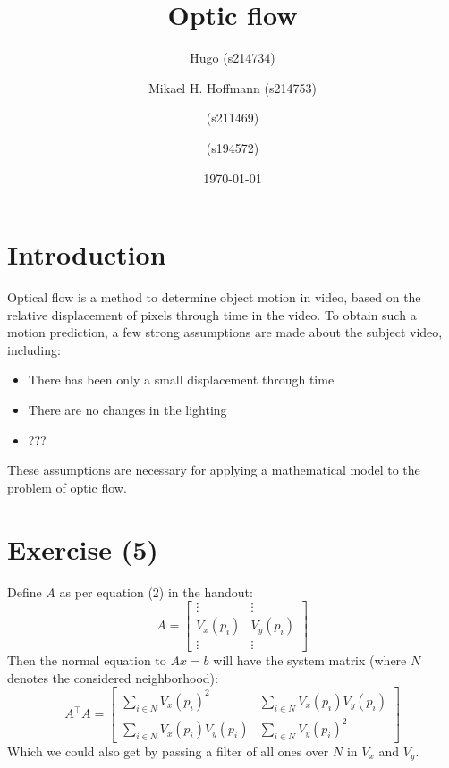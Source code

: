\documentclass{article}
\title{Optic flow}
\author{Hugo (s214734) \and Mikael H. Hoffmann (s214753) \and (s211469) \and (s194572)}
\date{\today}
\begin{document}
\maketitle

\section{Introduction}
Optical flow is a method to determine object motion in video, based on the relative displacement of pixels
through time in the video. To obtain such a motion prediction, a few strong assumptions are made
about the subject video, including:
\begin{itemize}
    \item There has been only a small displacement through time
    \item There are no changes in the lighting
    \item ???
\end{itemize}
These assumptions are necessary for applying a mathematical model to the problem of optic flow.











\section{Exercise (5)}
Define $A$ as per equation (2) in the handout:
\begin{equation}
    A = \begin{bmatrix}
    \vdots & \vdots \\
    V_{x}(p_i) & V_{y}(p_i) \\
    \vdots & \vdots
    \end{bmatrix}
\end{equation}
Then the normal equation to $Ax = b$ will have the system matrix (where $N$ denotes the considered neighborhood):
\begin{equation}
    A^\intercal A = \begin{bmatrix}
        \sum_{i \in N} V_{x}(p_i)^{2} & \sum_{i \in N} V_{x}(p_i)V_{y}(p_i) \\
        \sum_{i \in N} V_{x}(p_i)V_{y}(p_i) & \sum_{i \in N} V_{y}(p_i)^{2}
    \end{bmatrix}
\end{equation}
Which we could also get by passing a filter of all ones over $N$ in $V_x$ and $V_y$.
\end{document}
